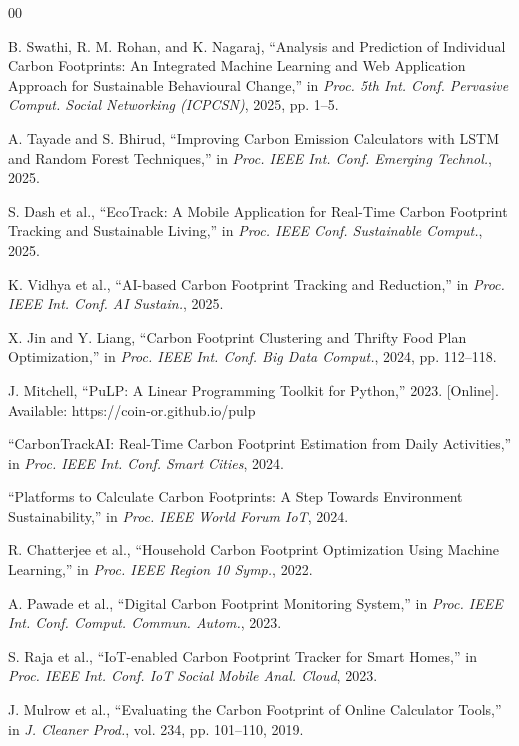 \documentclass[conference]{IEEEtran}
\begin{document}
\begin{thebibliography}{00}

 B. Swathi, R. M. Rohan, and K. Nagaraj, ``Analysis and Prediction of Individual Carbon Footprints: An Integrated Machine Learning and Web Application Approach for Sustainable Behavioural Change,'' in \textit{Proc. 5th Int. Conf. Pervasive Comput. Social Networking (ICPCSN)}, 2025, pp. 1--5.

 A. Tayade and S. Bhirud, ``Improving Carbon Emission Calculators with LSTM and Random Forest Techniques,'' in \textit{Proc. IEEE Int. Conf. Emerging Technol.}, 2025.

 S. Dash et al., ``EcoTrack: A Mobile Application for Real-Time Carbon Footprint Tracking and Sustainable Living,'' in \textit{Proc. IEEE Conf. Sustainable Comput.}, 2025.

 K. Vidhya et al., ``AI-based Carbon Footprint Tracking and Reduction,'' in \textit{Proc. IEEE Int. Conf. AI Sustain.}, 2025.

 X. Jin and Y. Liang, ``Carbon Footprint Clustering and Thrifty Food Plan Optimization,'' in \textit{Proc. IEEE Int. Conf. Big Data Comput.}, 2024, pp. 112--118.

 J. Mitchell, ``PuLP: A Linear Programming Toolkit for Python,'' 2023. [Online]. Available: https://coin-or.github.io/pulp

 ``CarbonTrackAI: Real-Time Carbon Footprint Estimation from Daily Activities,'' in \textit{Proc. IEEE Int. Conf. Smart Cities}, 2024.

 ``Platforms to Calculate Carbon Footprints: A Step Towards Environment Sustainability,'' in \textit{Proc. IEEE World Forum IoT}, 2024.

 R. Chatterjee et al., ``Household Carbon Footprint Optimization Using Machine Learning,'' in \textit{Proc. IEEE Region 10 Symp.}, 2022.

 A. Pawade et al., ``Digital Carbon Footprint Monitoring System,'' in \textit{Proc. IEEE Int. Conf. Comput. Commun. Autom.}, 2023.

 S. Raja et al., ``IoT-enabled Carbon Footprint Tracker for Smart Homes,'' in \textit{Proc. IEEE Int. Conf. IoT Social Mobile Anal. Cloud}, 2023.

 J. Mulrow et al., ``Evaluating the Carbon Footprint of Online Calculator Tools,'' in \textit{J. Cleaner Prod.}, vol. 234, pp. 101--110, 2019.


\end{thebibliography}
\end{document}
